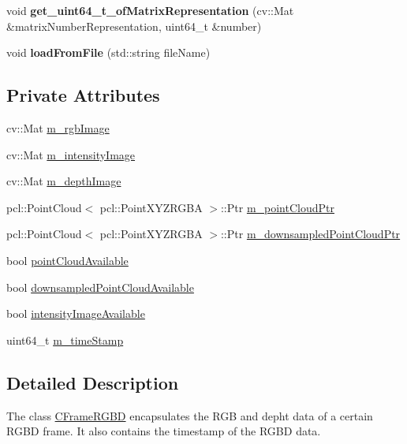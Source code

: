 \begin{DoxyCompactItemize}
\item 
\hypertarget{class_c_frame_r_g_b_d_a7312a178f68d3a0e8a864404805bcfde}{
void {\bfseries get\_\-uint64\_\-t\_\-ofMatrixRepresentation} (cv::Mat \&matrixNumberRepresentation, uint64\_\-t \&number)}
\label{class_c_frame_r_g_b_d_a7312a178f68d3a0e8a864404805bcfde}

\item 
\hypertarget{class_c_frame_r_g_b_d_af3a2aa2e5662f6c497814e99b2cbc13b}{
void {\bfseries loadFromFile} (std::string fileName)}
\label{class_c_frame_r_g_b_d_af3a2aa2e5662f6c497814e99b2cbc13b}

\end{DoxyCompactItemize}
\subsection*{Private Attributes}
\begin{DoxyCompactItemize}
\item 
cv::Mat \hyperlink{class_c_frame_r_g_b_d_aaaa8d12b6df4db4a2a2e050d6894fa64}{m\_\-rgbImage}
\item 
cv::Mat \hyperlink{class_c_frame_r_g_b_d_a4267ae0f2e87e7f1b8faccce68ffecd3}{m\_\-intensityImage}
\item 
cv::Mat \hyperlink{class_c_frame_r_g_b_d_a1dbfcec74d90c8cc98018a9f0df6c708}{m\_\-depthImage}
\item 
pcl::PointCloud$<$ pcl::PointXYZRGBA $>$::Ptr \hyperlink{class_c_frame_r_g_b_d_a72e3371759953f15c7bb6637bc6d8ab4}{m\_\-pointCloudPtr}
\item 
pcl::PointCloud$<$ pcl::PointXYZRGBA $>$::Ptr \hyperlink{class_c_frame_r_g_b_d_aaff14ee9689f9d2d895300e5236be6d0}{m\_\-downsampledPointCloudPtr}
\item 
bool \hyperlink{class_c_frame_r_g_b_d_ace30426f416cd66b2a0a256071d93464}{pointCloudAvailable}
\item 
bool \hyperlink{class_c_frame_r_g_b_d_a06f87da2b36ef01b47ac338adb6443ea}{downsampledPointCloudAvailable}
\item 
bool \hyperlink{class_c_frame_r_g_b_d_a445d7d67bbff8cdac482e1c10dba2dc9}{intensityImageAvailable}
\item 
uint64\_\-t \hyperlink{class_c_frame_r_g_b_d_a0f7c2fb4831a936c63b78305ab9298bd}{m\_\-timeStamp}
\end{DoxyCompactItemize}


\subsection{Detailed Description}
The class \hyperlink{class_c_frame_r_g_b_d}{CFrameRGBD} encapsulates the RGB and depht data of a certain RGBD frame. It also contains the timestamp of the RGBD data. 


